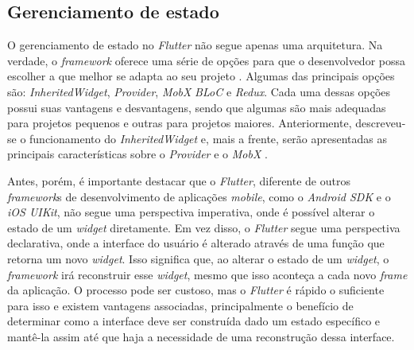 

\subsection{Gerenciamento de estado}
\label{cap2:Subsec:GerenciamentoEstado}
O gerenciamento de estado no \textit{Flutter} não segue apenas uma arquitetura. Na verdade, o \textit{framework} oferece uma série de opções para que o desenvolvedor possa escolher a que melhor se adapta ao seu projeto \cite{Faust2020}. Algumas das principais opções são: \textit{InheritedWidget}, \textit{Provider}, \textit{MobX} \textit{BLoC} e \textit{Redux}. Cada uma dessas opções possui suas vantagens e desvantagens, sendo que algumas são mais adequadas para projetos pequenos e outras para projetos maiores. Anteriormente, descreveu-se o funcionamento do \textit{InheritedWidget} e, mais a frente, serão apresentadas as principais características sobre o \textit{Provider} e o \textit{MobX} \cite{flutter2022statemgmt}.

Antes, porém, é importante destacar que o \textit{Flutter}, diferente de outros \textit{framework}s de desenvolvimento de aplicações \textit{mobile}, como o \textit{Android SDK} e o \textit{iOS UIKit}, não segue uma perspectiva imperativa, onde é possível alterar o estado de um \textit{widget} diretamente. Em vez disso, o \textit{Flutter} segue uma perspectiva declarativa, onde a interface do usuário é alterado através de uma função que retorna um novo \textit{widget}. Isso significa que, ao alterar o estado de um \textit{widget}, o \textit{framework} irá reconstruir esse \textit{widget}, mesmo que isso aconteça a cada novo \textit{frame} da aplicação. O processo pode ser custoso, mas o \textit{Flutter} é rápido o suficiente para isso e existem vantagens associadas, principalmente o benefício de determinar como a interface deve ser construída dado um estado específico e mantê-la assim até que haja a necessidade de uma reconstrução dessa interface.

